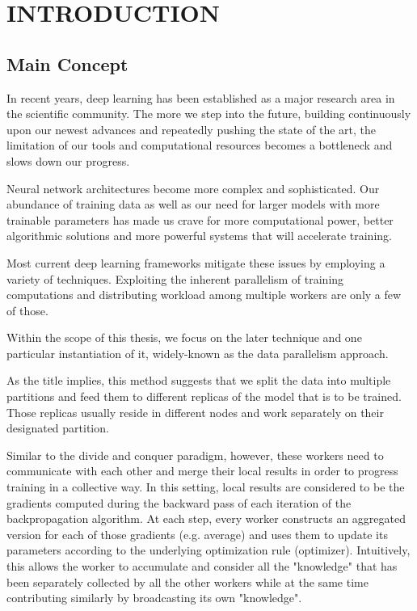 \chapter{INTRODUCTION}
    \section{Main Concept}
    In recent years, deep learning has been established as a major research area in the scientific community. 
    The more we step into the future, building continuously upon our newest advances and repeatedly pushing the state of the art, the limitation of our tools and computational resources becomes a bottleneck and slows down our progress.
    
    Neural network architectures become more complex and sophisticated. Our abundance of training data as well as our need for larger models with more trainable parameters has made us crave for more computational power, better algorithmic solutions and more powerful systems that will accelerate training.
    
    Most current deep learning frameworks mitigate these issues by employing a variety of techniques. Exploiting the inherent parallelism of training computations and distributing workload among multiple workers are only a few of those. 

    Within the scope of this thesis, we focus on the later technique and one particular instantiation of it, widely-known as the data parallelism approach. 
    
    As the title implies, this method suggests that we split the data into multiple partitions and feed them to different replicas of the model that is to be trained. Those replicas usually reside in different nodes and work separately on their designated partition. 
    
    Similar to the divide and conquer paradigm, however, these workers need to communicate with each other and merge their local results in order to progress training in a collective way. 
    In this setting, local results are considered to be the gradients computed during the backward pass of each iteration of the backpropagation algorithm. 
    At each step, every worker constructs an aggregated version for each of those gradients (e.g. average) and uses them to update its parameters according to the underlying optimization rule (optimizer). 
    Intuitively, this allows the worker to accumulate and consider all the "knowledge" that has been separately collected by all the other workers while at the same time contributing similarly by broadcasting its own "knowledge".
    
